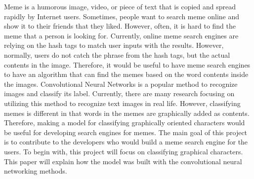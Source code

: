 Meme is a humorous image, video,
or piece of text that is copied and spread
rapidly by Internet users. Sometimes, people
want to search meme online and show it to their
friends that they liked. However,
often, it is hard to find the meme that a person
is looking for. Currently, online meme search engines are
relying on the hash tags to match user inputs with the results.
However, normally, users do not catch the phrase from the
hash tags, but the actual contents in the image. Therefore, it
would be useful to have meme search engines to have
an algorithm that can find the memes based on the word contents
inside the images.
\newline
\newline
\indent
Convolutional Neural Networks is a popular method to recognize images and
classify its label. Currently, there are many research focusing on utilizing
this method to recognize text images in real life. However, classifying
memes is different in that words in the memes are graphically added as contents.
Therefore, making a model for classifying graphically oriented characters
would be useful for developing search engines for memes.
\newline
\newline
\indent
The main goal of this project is to contribute to the developers who
would build a meme search engine for the users. To begin with, this project
will focus on classifying graphical characters. This paper will explain how
the model was built with the convolutional neural networking methods.
